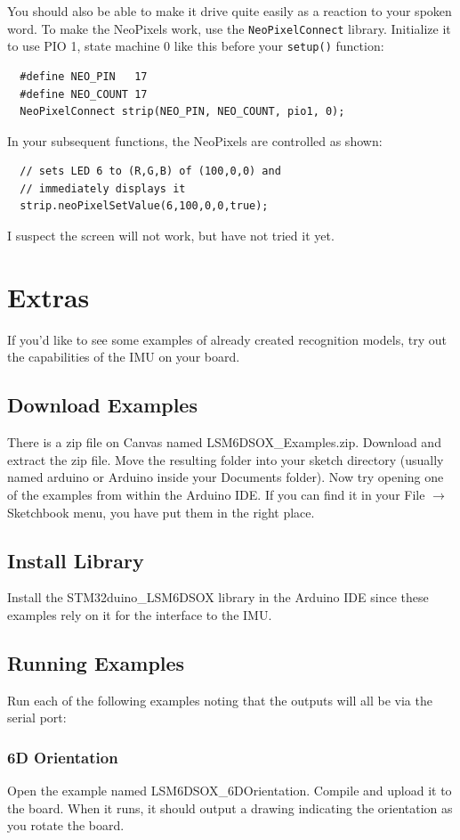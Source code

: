You should also be able to make it drive quite easily as a reaction to your spoken word. To make 
the NeoPixels work, use the \lstinline|NeoPixelConnect| library. Initialize it to use PIO 1, 
state machine 0 like this before your \lstinline|setup()| function:
\begin{lstlisting}
  #define NEO_PIN   17
  #define NEO_COUNT 17
  NeoPixelConnect strip(NEO_PIN, NEO_COUNT, pio1, 0);
\end{lstlisting}

In your subsequent functions, the NeoPixels are controlled as shown:
\begin{lstlisting}
  // sets LED 6 to (R,G,B) of (100,0,0) and 
  // immediately displays it
  strip.neoPixelSetValue(6,100,0,0,true);
\end{lstlisting}

I suspect the screen will not work, but have not tried it yet.

\section{Extras}
If you'd like to see some examples of already created recognition models, try out the 
capabilities of the IMU on your board. 

\subsection{Download Examples}
There is a zip file on Canvas named LSM6DSOX\_Examples.zip. Download and extract the zip 
file. Move the resulting folder into your sketch directory (usually named arduino or Arduino 
inside your Documents folder). Now try opening one of the examples from within the Arduino IDE.
If you can find it in your File $\rightarrow$ Sketchbook menu, you have put them in the right
place.

\subsection{Install Library}
Install the STM32duino\_LSM6DSOX library in the Arduino IDE since these examples rely on 
it for the interface to the IMU.

\subsection{Running Examples}
Run each of the following examples noting that the outputs will all be via the serial port:

\subsubsection{6D Orientation}
Open the example named LSM6DSOX\_6DOrientation. Compile and upload it to the board. When it
runs, it should output a drawing indicating the orientation as you rotate the board.

